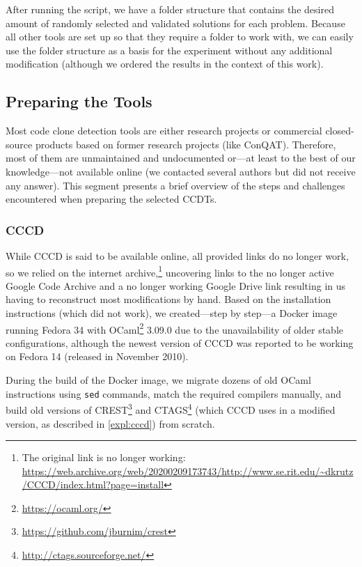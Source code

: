 \documentclass[10pt,journal,compsoc]{IEEEtran}
\def\todo#1{\textcolor{brown!80!yellow!70!black!90!red}{[\textsc{todo}: \textsf{#1}]}}
\newcommand*\urldate[2]{\url{#1}\;\textsuperscript{\color{gray}\DTMdate{#2}}}
\newcommand*\footurl[3][]{\footnote{#1\urldate{#2}{#3}}}
\begin{document}
After running the script, we have a folder structure that contains the desired amount of randomly selected and validated solutions for each problem.
Because all other tools are set up so that they require a folder to work with, we can easily use the folder structure as a basis for the experiment without any additional modification (although we ordered the results in the context of this work).



\subsection{Preparing the Tools}
Most code clone detection tools are either research projects or commercial closed-source products based on former research projects (like ConQAT).
Therefore, most of them are unmaintained and undocumented or---at least to the best of our knowledge---not available online (we contacted several authors but did not receive any answer).
This segment presents a brief overview of the steps and challenges encountered when preparing the selected CCDTs.

\subsubsection{CCCD}
While CCCD is said to be available online, all provided links do no longer work, so we relied on the internet archive,\footurl[The original link is no longer working: ]{https://web.archive.org/web/20200209173743/http://www.se.rit.edu/~dkrutz/CCCD/index.html?page=install}{2022-02-14} uncovering links to the no longer active Google Code Archive and a no longer working Google Drive link resulting in us having to reconstruct most modifications by hand.
Based on the installation instructions (which did not work), we created---step by step---a Docker image running Fedora 34 with OCaml\footurl{https://ocaml.org/}{2022-02-14} 3.09.0 due to the unavailability of older stable configurations, although the newest version of CCCD was reported to be working on Fedora 14 (released in November 2010).

During the build of the Docker image, we migrate dozens of old OCaml instructions using \texttt{sed} commands, match the required compilers manually, and build old versions of CREST\footurl{https://github.com/jburnim/crest}{2022-02-14} and CTAGS\footurl{http://ctags.sourceforge.net/}{2022-02-14} (which CCCD uses in a modified version, as described in \cref{expl:cccd}) from scratch.
\end{document}
